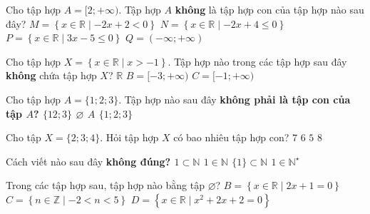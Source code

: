 \begin{ex}%
	Cho tập hợp $A = [2;+\infty)$. Tập hợp $A$ {\bf không} là tập hợp con của tập hợp nào  sau đây?
	\choice 
		{ $M = \left\{x \in \mathbb{R} \mid  -2x+2 < 0 \right\} $ }
		{$N = \left\{x \in \mathbb{R} \mid -2x+4 \le  0 \right\} $}
		{\True $P = \left\{x \in \mathbb{R} \mid 3x-5 \le 0 \right\}  $}
		{  $Q = (-\infty;+\infty)$}
\end{ex}

\begin{ex}%
	Cho tập hợp  $X = \left\{x \in \mathbb{R} \mid x > -1 \right\}$. Tập hợp nào trong các tập hợp sau đây {\bf không} chứa tập hợp $X$?
	\choice{\True $A =  [-3;7) $}
		 {$ \mathbb{R}$}
		{$ B  = [-3;+\infty)$}
		 {$ C = [-1; +\infty) $}
\end{ex}

\begin{ex}%
	Cho tập hợp $A=\{1;2;3\}$. Tập hợp nào sau đây \bf{không phải}  là tập con của tập $A$?
	 \choice
		{\True  $\{12;3\}$}
		 {$\varnothing$}
		{$A$} 
		 {$\{1;2;3\}$}
\end{ex}

\begin{ex}%
	Cho tập $X=\{2;3;4\}$. Hỏi tập hợp $X$ có bao nhiêu tập  hợp con?
	\choice 
		{  $7$}
		 {$6$}
		{$5$} 
		{\True $8$} 
\end{ex}

\begin{ex}%
	Cách viết nào sau đây \bf{không} đúng? 
	 \choice
		{\True $1 \subset  \mathbb{N}$}
		{$1  \in \mathbb{N}$}
		{$\{1\} \subset  \mathbb{N}$}
		{$1 \in \mathbb{N}^{\star}$} 
\end{ex}

\begin{ex}%
	Trong các  tập hợp sau, tập hợp nào bằng tập $\varnothing$?
		{$ B  = \left\{x \in \mathbb{R} \mid 2x+1= 0\right\}$}
		{$C= \left\{n \in  \mathbb{Z} \mid -2< n < 5 \right\} $}
		{\True $ D = \left\{x \in  \mathbb{R} \mid x^2+2x+2= 0\right\}$}
\end{ex}

